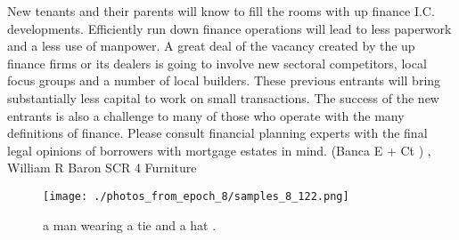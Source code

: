 \documentclass{article}%
\begin{document}
New tenants and their parents will know to fill the rooms with up finance I.C. developments. Efficiently run down finance operations will lead to less paperwork and a less use of manpower.\newline%
A great deal of the vacancy created by the up finance firms or its dealers is going to involve new sectoral competitors, local focus groups and a number of local builders. These previous entrants will bring substantially less capital to work on small transactions.\newline%
The success of the new entrants is also a challenge to many of those who operate with the many definitions of finance. Please consult financial planning experts with the final legal opinions of borrowers with mortgage estates in mind.\newline%
(Banca E + Ct ) , William R Baron SCR 4\newline%
Furniture\newline%

%


\begin{figure}[h!]%
\centering%
\texttt{[image: ./photos\_from\_epoch\_8/samples\_8\_122.png]}%
\caption{a man wearing a tie and a hat .}%
\end{figure}

%
\end{document}
